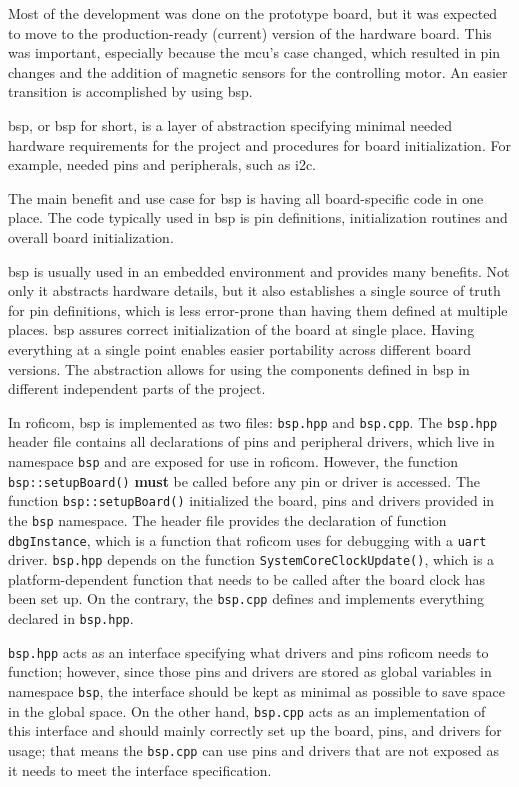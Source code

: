 \documentclass[
  digital,     %
  oneside,     %
  nosansbold,  %
  nocolorbold, %
  nolof,         %
  nolot,         %
]{fithesis4}
\begin{document}
Most of the development was done on the prototype board, but it was expected to move to the
production-ready (current) version of the hardware board. This was important, especially because the
\acrshort{mcu}'s case changed, which resulted in pin changes and the addition of magnetic sensors
for the controlling motor. An easier transition is accomplished by using \acrshort{bsp}.

\acrlong{bsp}, or \acrshort{bsp} for short, is a layer of abstraction specifying minimal needed
hardware requirements for the project and procedures for board initialization. For example, needed
pins and peripherals, such as \acrshort{i2c}. 

The main benefit and use case for \acrshort{bsp} is having all board-specific code in one place. The
code typically used in \acrshort{bsp} is pin definitions, initialization routines and overall board
initialization.

\acrshort{bsp} is usually used in an embedded environment and provides many benefits. Not only it
abstracts hardware details, but it also establishes a single source of truth for pin definitions,
which is less error-prone than having them defined at multiple places. \acrshort{bsp} assures
correct initialization of the board at single place. Having everything at a single point enables
easier portability across different board versions. The abstraction allows for using the components
defined in \acrshort{bsp} in different independent parts of the project. 

In \acrshort{roficom}, \acrshort{bsp} is implemented as two files: \verb|bsp.hpp| and
\verb|bsp.cpp|. The \verb|bsp.hpp| header file contains all declarations of pins and peripheral
drivers, which live in namespace \lstinline{bsp} and are exposed for use in \acrshort{roficom}.
However, the function \lstinline{bsp::setupBoard()} \textbf{must} be called before any pin or driver
is accessed. The function \lstinline{bsp::setupBoard()} initialized the board, pins and drivers
provided in the \lstinline{bsp} namespace. The header file provides the declaration of function
\lstinline{dbgInstance}, which is a function that \acrshort{roficom} uses for debugging with a
\texttt{uart} driver. \verb|bsp.hpp| depends on the function
\lstinline[breaklines=true]|SystemCoreClockUpdate()|, which is a platform-dependent function that
needs to be called after the board clock has been set up. On the contrary, the \verb|bsp.cpp|
defines and implements everything declared in \verb|bsp.hpp|. 

\verb|bsp.hpp| acts as an interface specifying what drivers and pins \acrshort{roficom} needs to
function; however, since those pins and drivers are stored as global variables in namespace
\lstinline{bsp}, the interface should be kept as minimal as possible to save space in the global
space. On the other hand, \verb|bsp.cpp| acts as an implementation of this interface and should
mainly correctly set up the board, pins, and drivers for usage; that means the \verb|bsp.cpp| can
use pins and drivers that are not exposed as it needs to meet the interface specification.
\end{document}
